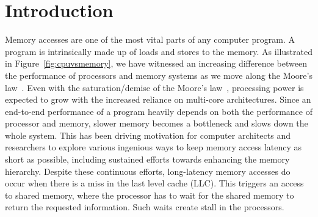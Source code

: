 \section{Introduction}
\label{sec:intro}
Memory accesses are one of the most vital parts of any computer program. A program is intrinsically made up of loads and stores to the memory. As illustrated in Figure~\ref{fig:cpuvsmemory}, we have witnessed an increasing difference between the performance of processors and memory systems as we move along the Moore's law~\cite{Wulf1995}.  Even with the saturation/demise of the Moore's law~\cite{waldrop2016, MooreMITR}, processing power is expected to grow with the increased reliance on multi-core architectures\cite{Geer}. Since an end-to-end performance of a program heavily depends on both the performance of processor and memory, slower memory becomes a bottleneck and slows down the whole system. This has been driving motivation for computer architects and researchers to explore various ingenious ways to keep memory access latency as short as possible, including sustained efforts towards enhancing the memory hierarchy\cite{Burger}. Despite these continuous efforts, long-latency memory accesses do occur when there is a miss in the last level cache (LLC). This triggers an access to shared memory, where the processor has to wait for the shared memory to return the requested information. Such waits create stall in the processors. 

